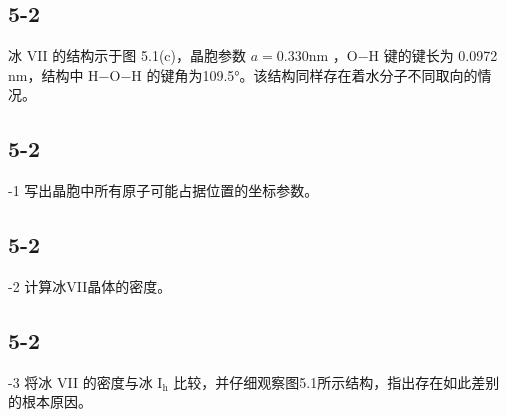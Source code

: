 \subsection*{5-2}
冰 VII 的结构⽰于图 5.1(c)，晶胞参数 $a = 0 . 3 3 0 \mathrm { n m }$ ，O−H 键的键⻓为 0.0972 nm，结构中 H−O−H 的键⻆为109.5°。该结构同样存在着⽔分⼦不同取向的情况。

\subsection*{5-2}
-1 写出晶胞中所有原⼦可能占据位置的坐标参数。

\subsection*{5-2}
-2 计算冰VII晶体的密度。

\subsection*{5-2}
-3 将冰 VII 的密度与冰 $\mathrm { I _ { h } }$ ⽐较，并仔细观察图5.1所⽰结构，指出存在如此差别的根本原因。
